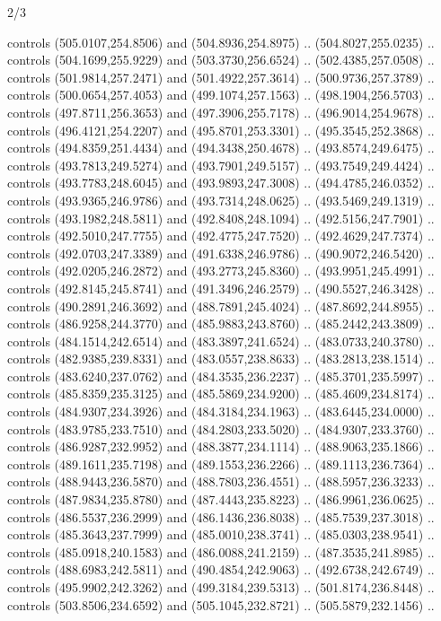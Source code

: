 \begin{flagdescription}{2/3}
\begin{scope}[xshift=0.5\flaglength,yshift=0.5\flagwidth,scale=\flagwidth/495.65]
\begin{scope}[y=0.8pt, x=0.8pt, yscale=-1,shift={(-463.76,-309.78)}]
  controls (505.0107,254.8506) and (504.8936,254.8975) .. (504.8027,255.0235) ..
  controls (504.1699,255.9229) and (503.3730,256.6524) .. (502.4385,257.0508) ..
  controls (501.9814,257.2471) and (501.4922,257.3614) .. (500.9736,257.3789) ..
  controls (500.0654,257.4053) and (499.1074,257.1563) .. (498.1904,256.5703) ..
  controls (497.8711,256.3653) and (497.3906,255.7178) .. (496.9014,254.9678) ..
  controls (496.4121,254.2207) and (495.8701,253.3301) .. (495.3545,252.3868) ..
  controls (494.8359,251.4434) and (494.3438,250.4678) .. (493.8574,249.6475) ..
  controls (493.7813,249.5274) and (493.7901,249.5157) .. (493.7549,249.4424) ..
  controls (493.7783,248.6045) and (493.9893,247.3008) .. (494.4785,246.0352) ..
  controls (493.9365,246.9786) and (493.7314,248.0625) .. (493.5469,249.1319) ..
  controls (493.1982,248.5811) and (492.8408,248.1094) .. (492.5156,247.7901) ..
  controls (492.5010,247.7755) and (492.4775,247.7520) .. (492.4629,247.7374) ..
  controls (492.0703,247.3389) and (491.6338,246.9786) .. (490.9072,246.5420) ..
  controls (492.0205,246.2872) and (493.2773,245.8360) .. (493.9951,245.4991) ..
  controls (492.8145,245.8741) and (491.3496,246.2579) .. (490.5527,246.3428) ..
  controls (490.2891,246.3692) and (488.7891,245.4024) .. (487.8692,244.8955) ..
  controls (486.9258,244.3770) and (485.9883,243.8760) .. (485.2442,243.3809) ..
  controls (484.1514,242.6514) and (483.3897,241.6524) .. (483.0733,240.3780) ..
  controls (482.9385,239.8331) and (483.0557,238.8633) .. (483.2813,238.1514) ..
  controls (483.6240,237.0762) and (484.3535,236.2237) .. (485.3701,235.5997) ..
  controls (485.8359,235.3125) and (485.5869,234.9200) .. (485.4609,234.8174) ..
  controls (484.9307,234.3926) and (484.3184,234.1963) .. (483.6445,234.0000) ..
  controls (483.9785,233.7510) and (484.2803,233.5020) .. (484.9307,233.3760) ..
  controls (486.9287,232.9952) and (488.3877,234.1114) .. (488.9063,235.1866) ..
  controls (489.1611,235.7198) and (489.1553,236.2266) .. (489.1113,236.7364) ..
  controls (488.9443,236.5870) and (488.7803,236.4551) .. (488.5957,236.3233) ..
  controls (487.9834,235.8780) and (487.4443,235.8223) .. (486.9961,236.0625) ..
  controls (486.5537,236.2999) and (486.1436,236.8038) .. (485.7539,237.3018) ..
  controls (485.3643,237.7999) and (485.0010,238.3741) .. (485.0303,238.9541) ..
  controls (485.0918,240.1583) and (486.0088,241.2159) .. (487.3535,241.8985) ..
  controls (488.6983,242.5811) and (490.4854,242.9063) .. (492.6738,242.6749) ..
  controls (495.9902,242.3262) and (499.3184,239.5313) .. (501.8174,236.8448) ..
  controls (503.8506,234.6592) and (505.1045,232.8721) .. (505.5879,232.1456) ..

\end{scope}
\end{scope}
\end{flagdescription}
